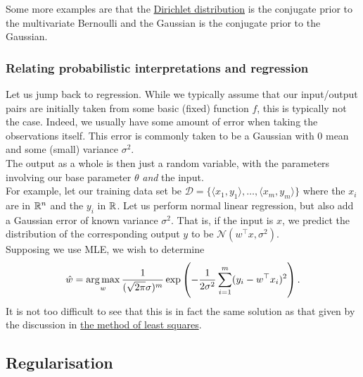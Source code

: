 \documentclass{article}
\begin{document}
			Some more examples are that the \href{https://en.wikipedia.org/wiki/Dirichlet_distribution}{Dirichlet distribution} is the conjugate prior to the multivariate Bernoulli and the Gaussian is the conjugate prior to the Gaussian.




		\subsubsection{Relating probabilistic interpretations and regression}

			Let us jump back to regression. While we typically assume that our input/output pairs are initially taken from some basic (fixed) function $f$, this is typically not the case. Indeed, we usually have some amount of error when taking the observations itself. This error is commonly taken to be a Gaussian with $0$ mean and some (small) variance $\sigma^2$.\\
			The output as a whole is then just a random variable, with the parameters involving our base parameter $\theta$ \emph{and} the input.\\
			
			For example, let our training data set be $\mathcal{D} = \{\langle x_1,y_1\rangle,\ldots,\langle x_m,y_m\rangle\}$ where the $x_i$ are in $\mathbb{R}^n$ and the $y_i$ in $\mathbb{R}$. Let us perform normal linear regression, but also add a Gaussian error of known variance $\sigma^2$. That is, if the input is $x$, we predict the distribution of the corresponding output $y$ to be $\mathcal{N}(w^\top x, \sigma^2)$.\\
			Supposing we use MLE, we wish to determine
			\[ \hat{w} = \operatorname*{arg\,max}_{w} \frac{1}{(\sqrt{2\pi}\sigma)^m} \exp \left( -\frac{1}{2\sigma^2} \sum_{i=1}^m (y_i - w^\top x_i)^2 \right). \]
			It is not too difficult to see that this is in fact the same solution as that given by the discussion in \hyperref[subsubsec: the method of least squares]{the method of least squares}.

	\subsection{Regularisation}
\end{document}
